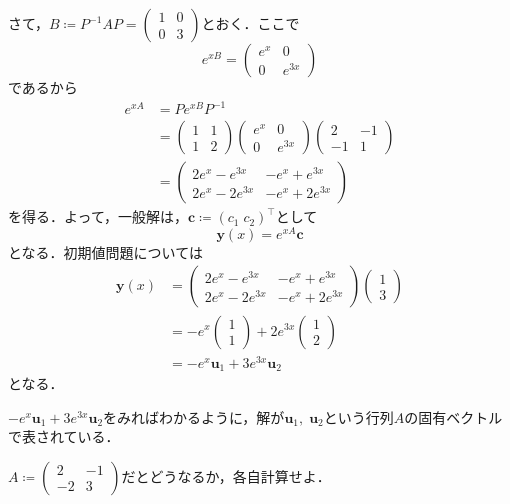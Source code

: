 \begin{example}
    さて，$B \coloneqq P^{-1}AP = \begin{pmatrix} 1 & 0 \\ 0 & 3 \end{pmatrix}$とおく．ここで
    \[ e^{xB} = \begin{pmatrix} e^x & 0 \\ 0 & e^{3x} \end{pmatrix} \]
    であるから
    \begin{align*}
        e^{xA} &= Pe^{xB}P^{-1} \\
        &= 
        \begin{pmatrix}
            1 & 1 \\
            1 & 2
        \end{pmatrix}
        \begin{pmatrix}
            e^x & 0 \\
            0 & e^{3x}
        \end{pmatrix}
        \begin{pmatrix}
            2 & -1 \\
            -1 & 1
        \end{pmatrix} \\
        &= 
        \begin{pmatrix}
            2e^x-e^{3x} & -e^x+e^{3x} \\
            2e^x-2e^{3x} & -e^x+2e^{3x}
        \end{pmatrix}
    \end{align*}
    を得る．よって，一般解は，$\bm{c} \coloneqq (c_1 \; c_2)^\top$として
    \[ \bm{y}(x) = e^{xA}\bm{c}\]
    となる．初期値問題については
    \begin{align*}
        \bm{y}(x) &= 
        \begin{pmatrix}
            2e^x-e^{3x} & -e^x+e^{3x} \\
            2e^x-2e^{3x} & -e^x+2e^{3x}
        \end{pmatrix}
        \begin{pmatrix}
            1 \\ 3
        \end{pmatrix} \\
        &= -e^x\begin{pmatrix} 1 \\ 1 \end{pmatrix} + 2e^{3x} \begin{pmatrix} 1 \\ 2 \end{pmatrix} \\
        &= -e^x \bm{u}_1 + 3e^{3x} \bm{u}_2
    \end{align*}
    となる．
\end{example}

\begin{remark}
    $-e^x \bm{u}_1 + 3e^{3x} \bm{u}_2$をみればわかるように，解が$\bm{u}_1, \; \bm{u}_2$という行列$A$の固有ベクトルで表されている．
\end{remark}

\begin{homework*}
    $A \coloneqq \begin{pmatrix}
        2 & -1 \\ 
        -2 & 3
    \end{pmatrix}$だとどうなるか，各自計算せよ．
\end{homework*}

